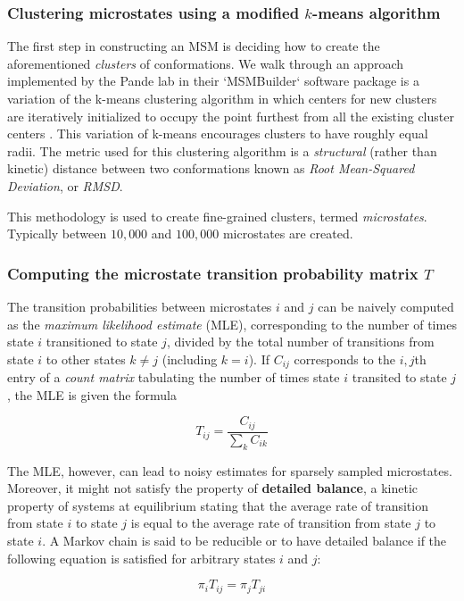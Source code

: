 \documentclass{article}
\begin{document}
\subsubsection{Clustering microstates using a modified $k$-means algorithm}
The first step in constructing an MSM is deciding how to create the aforementioned \textit{clusters} of conformations. We walk through an approach implemented by the Pande lab in their `MSMBuilder` \cite{msmbuilder} software package is a variation of the k-means clustering algorithm in which centers for new clusters are iteratively initialized to occupy the point furthest from all the existing cluster centers \cite{pande2009}. This variation of k-means encourages clusters to have roughly equal radii. The metric used for this clustering algorithm is a \textit{structural} (rather than kinetic) distance between two conformations known as \textit{Root Mean-Squared Deviation}, or \textit{RMSD}.

This methodology is used to create fine-grained clusters, termed \textit{microstates}. Typically between $10,000$ and $100,000$ microstates are created. 

\subsubsection{Computing the microstate transition probability matrix $T$}
The transition probabilities between microstates $i$ and $j$ can be naively computed as the \textit{maximum likelihood estimate} (MLE), corresponding to the number of times state $i$ transitioned to state $j$, divided by the total number of transitions from state $i$ to other states $k \neq j$ (including $k=i$). If $C_{ij}$ corresponds to the $i,j$th entry of a \textit{count matrix} tabulating the number of times state $i$ transited to state $j$, the MLE is given the formula

$$T_{ij} = \dfrac{C_{ij}}{\sum_k C_{ik}}$$

The MLE, however, can lead to noisy estimates for sparsely sampled microstates. Moreover, it might not satisfy the property of \textbf{detailed balance}, a kinetic property of systems at equilibrium stating that the average rate of transition from state $i$ to state $j$ is equal to the average rate of transition from state $j$ to state $i$. A Markov chain is said to be reducible or to have detailed balance if the following equation is satisfied for arbitrary states $i$ and $j$:

$$\pi_i T_{ij} = \pi_j T_{ji}$$
\end{document}
